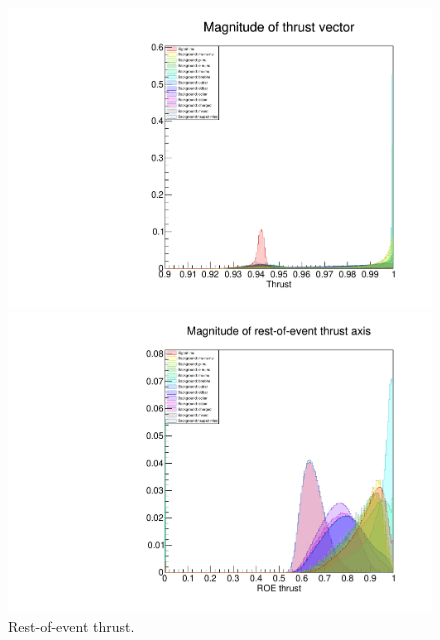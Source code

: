\documentclass[12pt]{thesis}  %
\begin{document}
\begin{figure}[h]
\centering
\begin{minipage}{.475\textwidth}
  \centering
  \includegraphics[width=\linewidth]{images/tauMG-thrustSignal.pdf}
  \caption[]%
  {{\small Signal thrust.}}
  \label{fig:tauMG signal thrust}
\end{minipage}%
\hfill
\begin{minipage}{.475\textwidth}
  \centering
  \includegraphics[width=\linewidth]{images/tauMG-thrustRoe.pdf}
  \caption[]%
  {{\small Rest-of-event thrust.}}
  \label{fig:tauMG ROE thrust}
\end{minipage}
\end{figure}
\end{document}
